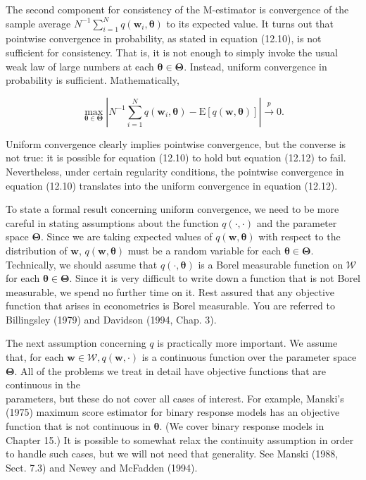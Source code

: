 \documentclass[10pt]{article}
\begin{document}
The second component for consistency of the M-estimator is convergence of the sample average $N^{-1} \sum_{i=1}^{N} q\left(\mathbf{w}_{i}, \boldsymbol{\theta}\right)$ to its expected value. It turns out that pointwise convergence in probability, as stated in equation (12.10), is not sufficient for consistency. That is, it is not enough to simply invoke the usual weak law of large numbers at each $\boldsymbol{\theta} \in \boldsymbol{\Theta}$. Instead, uniform convergence in probability is sufficient. Mathematically,


\begin{equation*}
\max _{\boldsymbol{\theta} \in \boldsymbol{\Theta}}\left|N^{-1} \sum_{i=1}^{N} q\left(\mathbf{w}_{i}, \boldsymbol{\theta}\right)-\mathrm{E}[q(\mathbf{w}, \boldsymbol{\theta})]\right| \xrightarrow{p} 0 . \tag{12.12}
\end{equation*}


Uniform convergence clearly implies pointwise convergence, but the converse is not true: it is possible for equation (12.10) to hold but equation (12.12) to fail. Nevertheless, under certain regularity conditions, the pointwise convergence in equation (12.10) translates into the uniform convergence in equation (12.12).

To state a formal result concerning uniform convergence, we need to be more careful in stating assumptions about the function $q(\cdot, \cdot)$ and the parameter space $\boldsymbol{\Theta}$. Since we are taking expected values of $q(\mathbf{w}, \boldsymbol{\theta})$ with respect to the distribution of $\mathbf{w}$, $q(\mathbf{w}, \boldsymbol{\theta})$ must be a random variable for each $\boldsymbol{\theta} \in \boldsymbol{\Theta}$. Technically, we should assume that $q(\cdot, \boldsymbol{\theta})$ is a Borel measurable function on $\mathscr{W}$ for each $\boldsymbol{\theta} \in \boldsymbol{\Theta}$. Since it is very difficult to write down a function that is not Borel measurable, we spend no further time on it. Rest assured that any objective function that arises in econometrics is Borel measurable. You are referred to Billingsley (1979) and Davidson (1994, Chap. 3).

The next assumption concerning $q$ is practically more important. We assume that, for each $\mathbf{w} \in \mathscr{W}, q(\mathbf{w}, \cdot)$ is a continuous function over the parameter space $\boldsymbol{\Theta}$. All of the problems we treat in detail have objective functions that are continuous in the\\
parameters, but these do not cover all cases of interest. For example, Manski's (1975) maximum score estimator for binary response models has an objective function that is not continuous in $\boldsymbol{\theta}$. (We cover binary response models in Chapter 15.) It is possible to somewhat relax the continuity assumption in order to handle such cases, but we will not need that generality. See Manski (1988, Sect. 7.3) and Newey and McFadden (1994).
\end{document}

